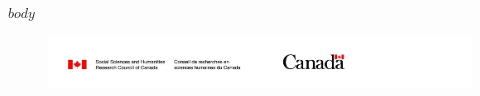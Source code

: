 \documentclass[12pt, oneside]{report}
\begin{document}
\newpage

$body$

\newpage

\thispagestyle{empty}


\begin{center}
    \begin{figure}[b]
        \includegraphics[width=\textwidth]{images/sshrc-canada-banner.jpg}
    \end{figure}    
\end{center}
\end{document}
